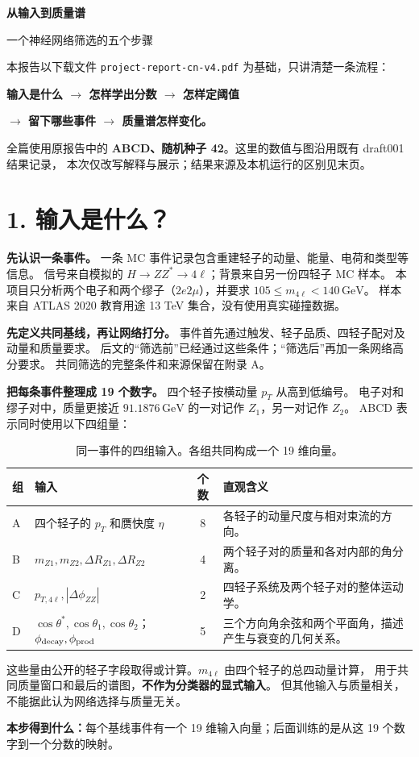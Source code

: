 \documentclass[11pt,a4paper,fontset=fandol,scheme=plain]{ctexart}
\newcommand{\reportsection}[1]{\section*{\textcolor{reportblue}{#1}}}
\newcommand{\gev}{\,\mathrm{GeV}}
\newcommand{\takeaway}[1]{\par\medskip\noindent\colorbox{reportblue!7}{\parbox{\dimexpr\linewidth-2\fboxsep\relax}{\textbf{本步得到什么：}#1}}\par}
\begin{document}
{\LARGE\bfseries\color{reportblue} 从输入到质量谱\par}
\vspace{4pt}
{\Large 一个神经网络筛选的五个步骤\par}
\vspace{4pt}
本报告以下载文件 \texttt{project-report-cn-v4.pdf} 为基础，只讲清楚一条流程：
\begin{center}
\textbf{输入是什么 $\to$ 怎样学出分数 $\to$ 怎样定阈值}\par
\textbf{$\to$ 留下哪些事件 $\to$ 质量谱怎样变化。}
\end{center}
全篇使用原报告中的 \textbf{ABCD、随机种子 42}。这里的数值与图沿用既有 draft001 结果记录，
本次仅改写解释与展示；结果来源及本机运行的区别见末页。

\reportsection{1. 输入是什么？}
\textbf{先认识一条事件。} 一条 MC 事件记录包含重建轻子的动量、能量、电荷和类型等信息。
信号来自模拟的 $H\to ZZ^*\to4\ell$；背景来自另一份四轻子 MC 样本。
本项目只分析两个电子和两个缪子（$2e2\mu$），并要求 $105\leq m_{4\ell}<140\gev$。
样本来自 ATLAS 2020 教育用途 13 TeV 集合\cite{OpenData}，没有使用真实碰撞数据。

\textbf{先定义共同基线，再让网络打分。} 事件首先通过触发、轻子品质、四轻子配对及动量和质量要求。
后文的“筛选前”已经通过这些条件；“筛选后”再加一条网络高分要求。
共同筛选的完整条件和来源保留在附录 A。

\textbf{把每条事件整理成 19 个数字。} 四个轻子按横动量 $p_T$ 从高到低编号。
电子对和缪子对中，质量更接近 $91.1876\gev$ 的一对记作 $Z_1$，另一对记作 $Z_2$。
ABCD 表示同时使用以下四组量：
\begin{table}[H]
\caption{同一事件的四组输入。各组共同构成一个 19 维向量。}
\small
\renewcommand{\arraystretch}{1.18}
\begin{tabularx}{\linewidth}{@{}p{.06\linewidth}p{.38\linewidth}cY@{}}
\toprule
组 & 输入 & 个数 & 直观含义 \\
\midrule
A & 四个轻子的 $p_T$ 和赝快度 $\eta$ & 8 & 各轻子的动量尺度与相对束流的方向。\\
B & $m_{Z1},m_{Z2},\Delta R_{Z1},\Delta R_{Z2}$ & 4 & 两个轻子对的质量和各对内部的角分离。\\
C & $p_{T,4\ell},|\Delta\phi_{ZZ}|$ & 2 & 四轻子系统及两个轻子对的整体运动学。\\
D & $\cos\theta^*,\cos\theta_1,\cos\theta_2$；$\phi_{\rm decay},\phi_{\rm prod}$ & 5 & 三个方向角余弦和两个平面角，描述产生与衰变的几何关系。\\
\bottomrule
\end{tabularx}
\end{table}
这些量由公开的轻子字段取得或计算。$m_{4\ell}$ 由四个轻子的总四动量计算，
用于共同质量窗口和最后的谱图，\textbf{不作为分类器的显式输入}。
但其他输入与质量相关，不能据此认为网络选择与质量无关。
\takeaway{每个基线事件有一个 19 维输入向量；后面训练的是从这 19 个数字到一个分数的映射。}
\end{document}
